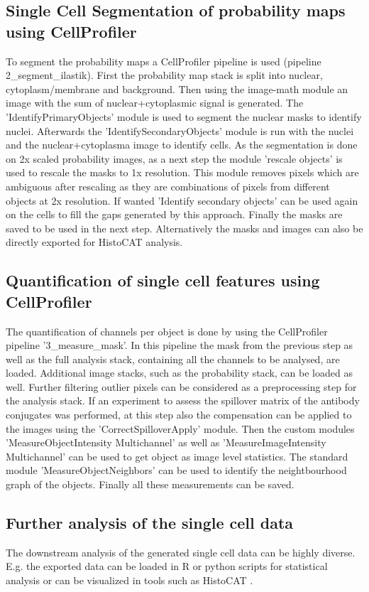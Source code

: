 \documentclass[a4paper]{article}
\begin{document}
\subsection{Single Cell Segmentation of probability maps using CellProfiler}
To segment the probability maps a CellProfiler pipeline is used (pipeline 2\_segment\_ilastik). First the probability map stack is
split into nuclear, cytoplasm/membrane and background. Then using the image-math module an image
with the sum of nuclear+cytoplasmic signal is generated.
The 'IdentifyPrimaryObjects' module is used to segment the nuclear masks to identify nuclei.
Afterwards the 'IdentifySecondaryObjects' module is run with the nuclei and the
nuclear+cytoplasma image to identify cells.
As the segmentation is done on 2x scaled probability images, as a next step the module 'rescale
objects' is used to rescale the masks to 1x resolution. This module removes pixels which are
ambiguous after rescaling as they are combinations of pixels from different objects at 2x
resolution. If wanted 'Identify secondary objects' can be used again on the cells to fill the gaps
generated by this approach.
Finally the masks are saved to be used in the next step.
Alternatively the masks and images can also be directly exported for HistoCAT analysis.

\subsection{Quantification of single cell features using CellProfiler}
The quantification of channels per object is done by using the CellProfiler pipeline '3\_measure\_mask'. In this
pipeline the mask from the previous step as well as the full analysis stack, containing all the
channels to be analysed, are loaded. Additional image stacks, such as the probability stack, can be
loaded as well. Further filtering outlier pixels can be considered as a preprocessing step for the
analysis stack. If an experiment to assess the spillover matrix of the antibody conjugates was performed,
at this step also the compensation can be applied to the images using the 'CorrectSpilloverApply' module.
Then the custom modules 'MeasureObjectIntensity Multichannel' as well as 'MeasureImageIntensity Multichannel' can be used to get object as
image level statistics. The standard module 'MeasureObjectNeighbors' can be used to identify the neightbourhood graph
of the objects.
Finally all these measurements can be saved.

\subsection{Further analysis of the single cell data}
The downstream analysis of the generated single cell data can be highly diverse. E.g. the exported
data can be loaded in R or python scripts for statistical analysis or can be visualized in tools
such as HistoCAT \cite{schapiro_histocat:_2017}. 
\end{document}

